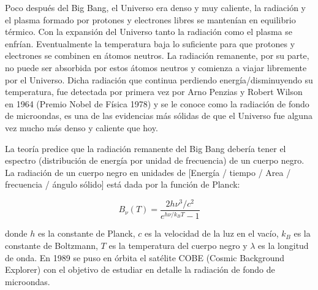 \documentclass[letter, 11pt]{article}
\begin{document}
\vspace{1.5em}

Poco después del Big Bang, el Universo era denso y muy caliente, la radiación y
el plasma formado por protones y electrones libres se mantenían en equilibrio
térmico. Con la expansión del Universo tanto la radiación como el plasma se
enfrían. Eventualmente la temperatura baja lo suficiente para que protones y
electrones se combinen en átomos neutros. La radiación remanente, por su parte,
no puede ser absorbida por estos átomos neutros y comienza a viajar libremente
por el Universo. Dicha radiación que continua perdiendo energía/disminuyendo
su temperatura, fue detectada por primera vez por Arno Penzias y Robert Wilson
en 1964 (Premio Nobel de Física 1978) y se le conoce como la radiación de fondo
de microondas, es una de las evidencias más sólidas de que el Universo fue
alguna vez mucho más denso y caliente que hoy.

La teoría predice que la radiación remanente del Big Bang debería tener el
espectro (distribución de energía por unidad de frecuencia) de un cuerpo negro.
La radiación de un cuerpo negro en unidades de [Energía / tiempo / Area /
frecuencia / ángulo sólido] está dada por la función de Planck:

$$B_\nu(T) = \frac{2 h \nu^3 / c^2}{e^{h\nu/k_BT} - 1} $$

donde $h$ es la constante de Planck, $c$ es la velocidad de la luz en el vacío,
$k_B$ es la constante de Boltzmann, $T$ es la temperatura del cuerpo negro y
$\lambda$ es la longitud de onda. En 1989 se puso en órbita el satélite COBE
(Cosmic Background Explorer) con el objetivo de estudiar en detalle la
radiación de fondo de microondas.
\end{document}

